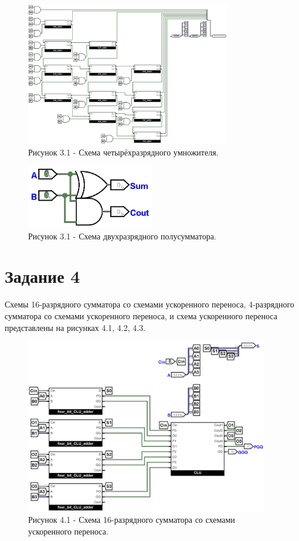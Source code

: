 \documentclass[oneside,a4paper,14pt]{extarticle}
\begin{document}
\begin{figure}[h!]
	\centering
	\includegraphics[width=0.8\textwidth]{pics/3.png}
	\caption*{Рисунок 3.1 - Схема четырёхразрядного умножителя.}
\end{figure}

\begin{figure}[h!]
	\centering
	\includegraphics[width=0.5\textwidth]{pics/3_ha.png}
	\caption*{Рисунок 3.1 - Схема двухразрядного полусумматора.}
\end{figure}
\newpage

\section*{Задание 4}

Схемы 16-разрядного сумматора со схемами ускоренного переноса, 4-разрядного сумматора со схемами ускоренного переноса,
и схема ускоренного переноса представлены на рисунках 4.1, 4.2, 4.3.\\

\begin{figure}[h!]
	\centering
	\includegraphics[width=0.95\textwidth]{pics/4.png}
	\caption*{Рисунок 4.1 - Схема 16-разрядного сумматора со схемами ускоренного переноса.}
\end{figure}
\end{document}
